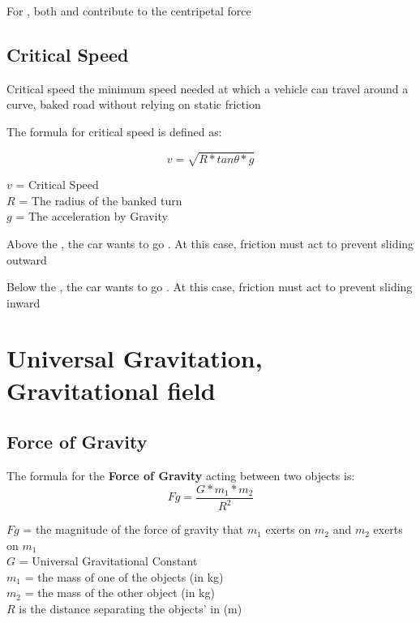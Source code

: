 For , both  and  contribute to the centripetal force

\subsection{Critical Speed}
\begin{definition}
    Critical speed the minimum speed needed at which a vehicle can travel around a curve, baked road without relying on static friction
\end{definition}

The formula for critical speed is defined as:
\begin{cyanblock}
    \[
        v = \sqrt{R*tan\theta *g}
    \]
    \begin{center}
        $v$ = Critical Speed\\
        $R$ = The radius of the banked turn\\
        $g$ = The acceleration by Gravity\\
    \end{center}
\end{cyanblock}

Above the , the car wants to go . At this case, friction must act  to prevent sliding outward

Below the , the car wants to go . At this case, friction must act  to prevent sliding inward

\section{Universal Gravitation, Gravitational field}
\subsection{Force of Gravity}
The formula for the \textbf{Force of Gravity} acting between two objects is:
\[
    Fg = \frac{G * m_{1} * m_{2}}{R^2}
\]
\begin{center}
    $Fg$ = the magnitude of the force of gravity that $m_{1}$ exerts on $m_{2}$ and $m_{2}$ exerts on $m_{1}$\\
    $G$ = Universal Gravitational Constant\\
    $m_{1}$ = the mass of one of the objects (in kg)\\
    $m_{2}$ = the mass of the other object (in kg)\\
    $R$ is the distance separating the objects'  in (m)
\end{center}

